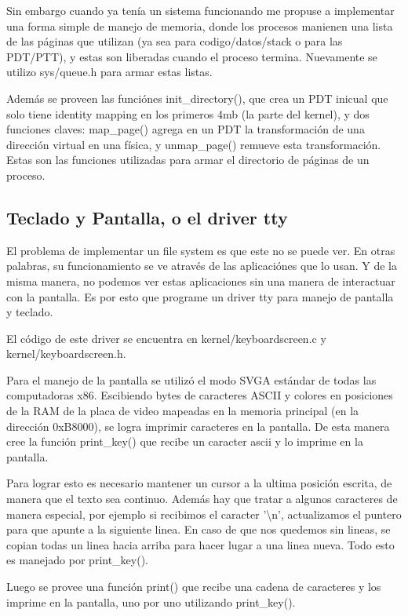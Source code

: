 Sin embargo cuando ya tenía un sistema funcionando me propuse a implementar una
forma simple de manejo de memoria, donde los procesos manienen una lista de las
páginas que utilizan (ya sea para codigo/datos/stack o para las PDT/PTT), y
estas son liberadas cuando el proceso termina. Nuevamente se utilizo
sys/queue.h para armar estas listas.

Además se proveen las funciónes init\_directory(), que crea un PDT inicual que
solo tiene identity mapping en los primeros 4mb (la parte del kernel), y dos
funciones claves: map\_page() agrega en un PDT la transformación de una
dirección virtual en una física, y unmap\_page() remueve esta transformación.
Estas son las funciones utilizadas para armar el directorio de páginas de un
proceso.

\subsection{Teclado y Pantalla, o el driver tty}

El problema de implementar un file system es que este no se puede ver. En otras
palabras, su funcionamiento se ve através de las aplicaciónes que lo usan. Y de
la misma manera, no podemos ver estas aplicaciones sin una manera de
interactuar con la pantalla. Es por esto que programe un driver tty para manejo
de pantalla y teclado.

El código de este driver se encuentra en kernel/keyboardscreen.c y
kernel/keyboardscreen.h.

Para el manejo de la pantalla se utilizó el modo SVGA estándar de todas las
computadoras x86. Escibiendo bytes de caracteres ASCII y colores en posiciones
de la RAM de la placa de video mapeadas en la memoria principal (en la
dirección 0xB8000), se logra imprimir caracteres en la pantalla. De esta manera
cree la función print\_key() que recibe un caracter ascii y lo imprime en la
pantalla.

Para lograr esto es necesario mantener un cursor a la ultima posición escrita,
de manera que el texto sea continuo. Además hay que tratar a algunos caracteres
de manera especial, por ejemplo si recibimos el caracter '\textbackslash n',
actualizamos el puntero para que apunte a la siguiente linea. En caso de que
nos quedemos sin lineas, se copian todas un linea hacia arriba para hacer
lugar a una linea nueva. Todo esto es manejado por print\_key().

Luego se provee una función print() que recibe una cadena de caracteres y los
imprime en la pantalla, uno por uno utilizando print\_key().

